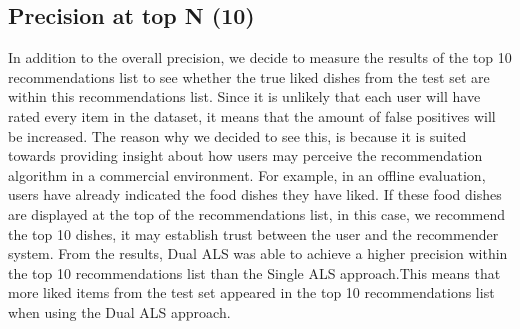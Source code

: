 \subsection{Precision at top N (10)}
In addition to the overall precision, we decide to measure the results of the top 10 recommendations list to see whether the true liked dishes from the test set are within this recommendations list. Since it is unlikely that each user will have rated every item in the dataset, it means that the amount of false positives will be increased. The reason why we decided to see this, is because it is suited towards providing insight about how users may perceive the recommendation algorithm in a commercial environment. For example, in an offline evaluation, users have already indicated the food dishes they have liked. If these food dishes are displayed at the top of the recommendations list, in this case, we recommend the top 10 dishes, it may establish trust between the user and the recommender system. From the results, Dual ALS was able to achieve a higher precision within the top 10 recommendations list than the Single ALS approach.This means that more liked items from the test set appeared in the top 10 recommendations list when using the Dual ALS approach.    


